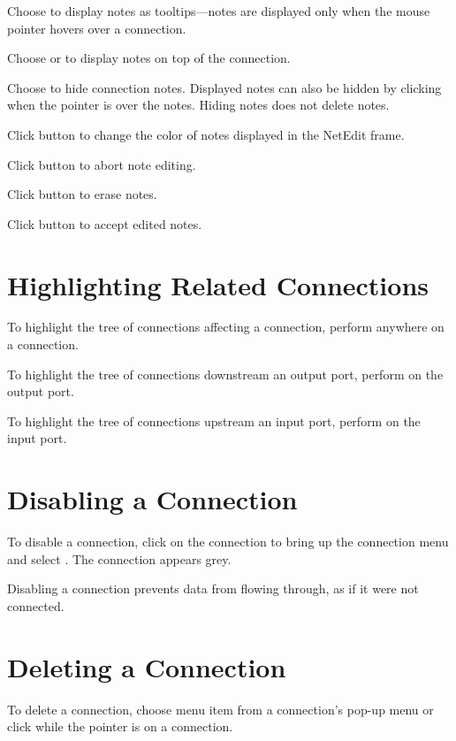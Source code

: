 Choose  to display notes as tooltips---notes are
displayed only when the mouse pointer hovers over a connection.

Choose  or  to display notes on top
of the connection.

Choose  to hide connection notes.  Displayed notes can
also be hidden by clicking  when the pointer is over
the notes.  Hiding notes does not delete notes.

Click button  to change the color of notes
displayed in the NetEdit frame.

Click button  to abort note editing.

Click button  to erase notes.

Click button  to accept edited notes.


\section{Highlighting Related Connections}
\label{sec:highlightconnect}

To highlight the tree of connections affecting a connection, perform
 anywhere on a connection.

To highlight the tree of connections downstream an output port,
perform  on the output port.

To highlight the tree of connections upstream an input port,
perform  on the input port.

\section{Disabling a Connection}
\label{sec:disableconnect}

To disable a connection, click  on the connection to
bring up the connection menu and select . The
connection appears grey.

Disabling a connection prevents data from flowing through, as if it were
not connected.

\section{Deleting a Connection}
\label{sec:deleteconnections}

To delete a connection, choose menu item  from a
connection's pop-up menu or click  while the
pointer is on a connection.

